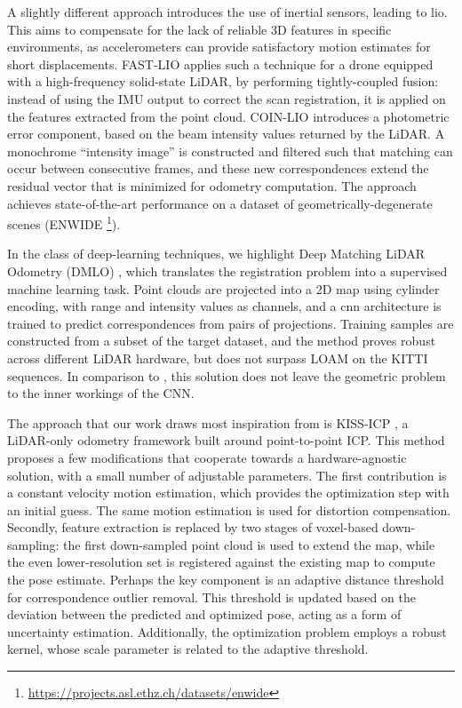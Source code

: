 A slightly different approach introduces the use of inertial sensors, leading to \acrfull{lio}. This aims to compensate for the lack of reliable 3D features in specific environments, as accelerometers can provide satisfactory motion estimates for short displacements. FAST-LIO \cite{fastlio} applies such a technique for a drone equipped with a high-frequency solid-state LiDAR, by performing tightly-coupled fusion: instead of using the IMU output to correct the scan registration, it is applied on the features extracted from the point cloud. COIN-LIO \cite{pfreundschuh2024coin} introduces a photometric error component, based on the beam intensity values returned by the LiDAR. A monochrome ``intensity image'' is constructed and filtered such that matching can occur between consecutive frames, and these new correspondences extend the residual vector that is minimized for odometry computation. The approach achieves state-of-the-art performance on a dataset of geometrically-degenerate scenes (ENWIDE \footnote{\url{https://projects.asl.ethz.ch/datasets/enwide}}).


In the class of deep-learning techniques, we highlight Deep Matching LiDAR Odometry (DMLO) \cite{li2020dmlo}, which translates the registration problem into a supervised machine learning task. Point clouds are projected into a 2D map using cylinder encoding, with range and intensity values as channels, and a \acrfull{cnn} architecture is trained to predict correspondences from pairs of projections. Training samples are constructed from a subset of the target dataset, and the method proves robust across different LiDAR hardware, but does not surpass LOAM on the KITTI sequences. In comparison to \cite{li2019net}, this solution does not leave the geometric problem to the inner workings of the CNN.


The approach that our work draws most inspiration from is KISS-ICP \cite{vizzo2023ral}, a LiDAR-only odometry framework built around point-to-point ICP. This method proposes a few modifications that cooperate towards a hardware-agnostic solution, with a small number of adjustable parameters. The first contribution is a constant velocity motion estimation, which provides the optimization step with an initial guess. The same motion estimation is used for distortion compensation. Secondly, feature extraction is replaced by two stages of voxel-based down-sampling: the first down-sampled point cloud is used to extend the map, while the even lower-resolution set is registered against the existing map to compute the pose estimate. Perhaps the key component is an adaptive distance threshold for correspondence outlier removal. This threshold is updated based on the deviation between the predicted and optimized pose, acting as a form of uncertainty estimation. Additionally, the optimization problem employs a robust kernel, whose scale parameter is related to the adaptive threshold.

